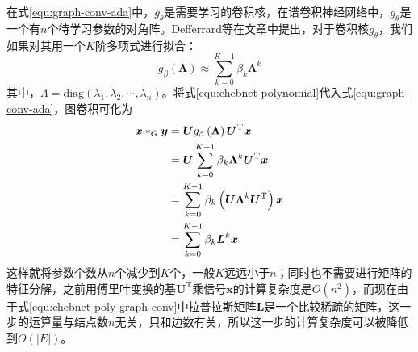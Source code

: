 \documentclass[final]{cvpr}
\begin{document}
在式\ref{equ:graph-conv-ada}中，$g_{\theta}$是需要学习的卷积核，在谱卷积神经网络中，$g_{\theta}$是一个有$n$个待学习参数的对角阵。Defferrard等在文章中提出，对于卷积核$g_{\theta}$，我们如果对其用一个$K$阶多项式进行拟合：
\begin{equation}\label{equ:chebnet-polynomial}
    g_{\beta}\left( \boldsymbol{\Lambda} \right)
    \approx \sum_{k=0}^{K-1} \beta_k
    \boldsymbol{\Lambda}^k
\end{equation}
其中，$\Lambda=\mathrm{diag}\left( \lambda_1,\lambda_2,\cdots,\lambda_n \right)$。将式\ref{equ:chebnet-polynomial}代入式\ref{equ:graph-conv-ada}，图卷积可化为
\begin{align}
    \boldsymbol{x} *_G \boldsymbol{y}
    &= \boldsymbol{U}
    g_{\beta}\left( \boldsymbol{\Lambda} \right)
    \boldsymbol{U}^{\mathrm{T}}\boldsymbol{x} \notag \\
    &=\boldsymbol{U} \sum_{k=0}^{K-1} \beta_k \boldsymbol{\Lambda}^k
    \boldsymbol{U}^{\mathrm{T}}\boldsymbol{x} \notag \\
    &=\sum_{k=0}^{K-1} \beta_k
    \left( \boldsymbol{U} \boldsymbol{\Lambda}^k
    \boldsymbol{U}^{\mathrm{T}}
    \right) \boldsymbol{x} \notag \\
    &=\sum_{k=0}^{K-1} \beta_k
    \boldsymbol{L}^k
    \boldsymbol{x} \label{equ:chebnet-poly-graph-conv}
\end{align}
这样就将参数个数从$n$个减少到$K$个，一般$K$远远小于$n$；同时也不需要进行矩阵的特征分解，之前用傅里叶变换的基$\boldsymbol{U}^{\mathrm{T}}$乘信号$\boldsymbol{x}$的计算复杂度是$O \left( n^2 \right)$，而现在由于式\ref{equ:chebnet-poly-graph-conv}中拉普拉斯矩阵$\boldsymbol{L}$是一个比较稀疏的矩阵，这一步的运算量与结点数$n$无关，只和边数有关，所以这一步的计算复杂度可以被降低到$O \left( \left| E \right|\right)$。
\end{document}
